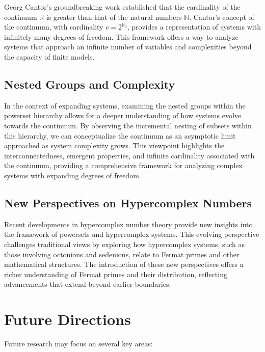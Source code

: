 \documentclass[12pt]{article}
\begin{document}
Georg Cantor’s groundbreaking work established that the cardinality of the continuum \( \mathbb{R} \) is greater than that of the natural numbers \( \mathbb{N} \). Cantor’s concept of the continuum, with cardinality \( c = 2^{\aleph_0} \), provides a representation of systems with infinitely many degrees of freedom. This framework offers a way to analyze systems that approach an infinite number of variables and complexities beyond the capacity of finite models.

\subsection{Nested Groups and Complexity}

In the context of expanding systems, examining the nested groups within the powerset hierarchy allows for a deeper understanding of how systems evolve towards the continuum. By observing the incremental nesting of subsets within this hierarchy, we can conceptualize the continuum as an asymptotic limit approached as system complexity grows. This viewpoint highlights the interconnectedness, emergent properties, and infinite cardinality associated with the continuum, providing a comprehensive framework for analyzing complex systems with expanding degrees of freedom.

\subsection{New Perspectives on Hypercomplex Numbers}

Recent developments in hypercomplex number theory provide new insights into the framework of powersets and hypercomplex systems. This evolving perspective challenges traditional views by exploring how hypercomplex systems, such as those involving octonions and sedenions, relate to Fermat primes and other mathematical structures. The introduction of these new perspectives offers a richer understanding of Fermat primes and their distribution, reflecting advancements that extend beyond earlier boundaries.

\section{Future Directions}

Future research may focus on several key areas:
\end{document}
